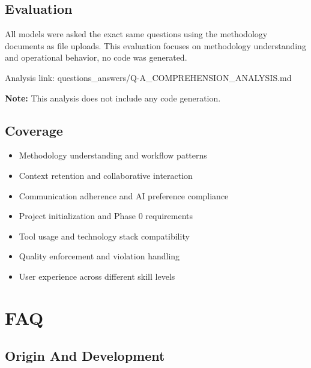 \documentclass{article}
\begin{document}
\subsection{Evaluation}
All models were asked the exact same questions using the methodology documents as file uploads. This evaluation focuses on methodology understanding and operational behavior, no code was generated.

Analysis link: questions\_answers/Q-A\_COMPREHENSION\_ANALYSIS.md

\textbf{Note:} This analysis does not include any code generation.

\subsection{Coverage}
\begin{itemize}[noitemsep]
\item Methodology understanding and workflow patterns
\item Context retention and collaborative interaction
\item Communication adherence and AI preference compliance
\item Project initialization and Phase 0 requirements
\item Tool usage and technology stack compatibility
\item Quality enforcement and violation handling
\item User experience across different skill levels
\end{itemize}

\section{FAQ}

\subsection{Origin And Development}
\end{document}

